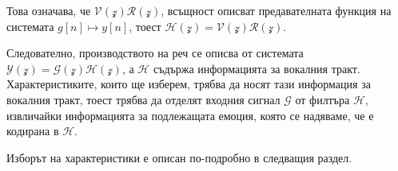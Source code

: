 \documentclass[main.tex]{subfiles}
\begin{document}
Това означава, че $\mathcal{V}(\mathcal{z})\mathcal{R}(\mathcal{z})$, всъщност описват предавателната функция на системата $g[n] \mapsto y[n]$, тоест $\mathcal{H}(\mathcal{z}
) = \mathcal{V}(\mathcal{z})\mathcal{R}(\mathcal{z})$.

Следователно, производството на реч се описва от системата $\mathcal{Y}(\mathcal{z}) = \mathcal{G}(\mathcal{z})\mathcal{H}(\mathcal{z})$,
а $\mathcal{H}$ съдържа информацията за вокалния тракт.
Характеристиките, които ще изберем, трябва да носят тази информация за вокалния тракт,
тоест трябва да отделят входния сигнал $\mathcal{G}$ от филтъра $\mathcal{H}$, извличайки информацията
за подлежащата емоция, която се надяваме, че е кодирана в $\mathcal{H}$.

Изборът на характеристики е описан по-подробно в следващия раздел.
\end{document}
